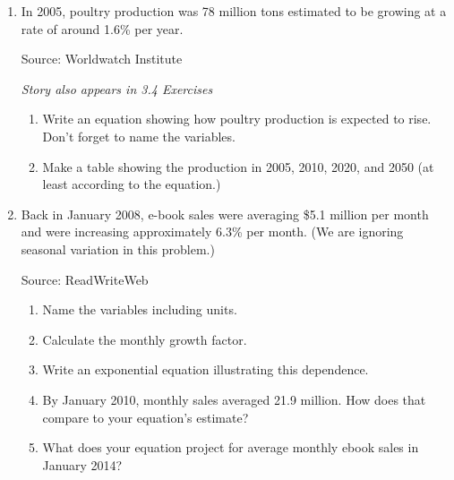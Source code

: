 \begin{enumerate}
\item In 2005, poultry production was 78 million tons estimated to be growing at a rate of around 1.6\% per year.   
\hfill \begin{footnotesize} Source:  Worldwatch Institute \end{footnotesize} 

 \hfill \emph{Story also appears in 3.4 Exercises}
\begin{enumerate}
\item Write an equation showing how poultry production is expected to rise. Don't forget to name the variables.
\item Make a table showing the production in 2005, 2010, 2020, and 2050 (at least according to the equation.)
\end{enumerate} 

\item Back in January 2008, e-book sales were averaging \$5.1 million per month and were increasing approximately 6.3\% per month.  (We are ignoring seasonal variation in this problem.)
\hfill \begin{footnotesize} Source:  ReadWriteWeb \end{footnotesize} 

\begin{enumerate}
\item Name the variables including units.
\item Calculate the monthly growth factor.
\item Write an exponential equation illustrating this dependence.  
\item By January 2010, monthly sales averaged 21.9 million.  How does that compare to your equation's estimate?
\item What does your equation project for average monthly ebook sales in January 2014?
\end{enumerate}

\end{enumerate}